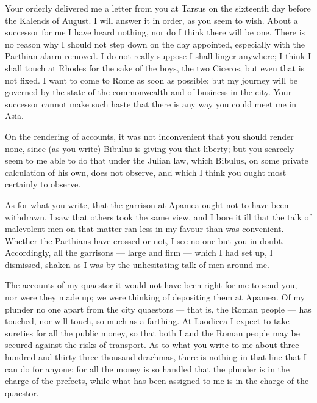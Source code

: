 

 Your orderly delivered me a letter from you at Tarsus on the sixteenth day before the Kalends of August. I will answer it in order, as you seem to wish. About a successor for me I have heard nothing, nor do I think there will be one. There is no reason why I should not step down on the day appointed, especially with the Parthian alarm removed. I do not really suppose I shall linger anywhere; I think I shall touch at Rhodes for the sake of the boys, the two Ciceros, but even that is not fixed. I want to come to Rome as soon as possible; but my journey will be governed by the state of the commonwealth and of business in the city. Your successor cannot make such haste that there is any way you could meet me in Asia.

 On the rendering of accounts, it was not inconvenient that you should render none, since (as you write) Bibulus is giving you that liberty; but you scarcely seem to me able to do that under the Julian law, which Bibulus, on some private calculation of his own, does not observe, and which I think you ought most certainly to observe.

 As for what you write, that the garrison at Apamea ought not to have been withdrawn, I saw that others took the same view, and I bore it ill that the talk of malevolent men on that matter ran less in my favour than was convenient. Whether the Parthians have crossed or not, I see no one but you in doubt. Accordingly, all the garrisons --- large and firm --- which I had set up, I dismissed, shaken as I was by the unhesitating talk of men around me.

 The accounts of my quaestor it would not have been right for me to send you, nor were they made up; we were thinking of depositing them at Apamea. Of my plunder no one apart from the city quaestors --- that is, the Roman people --- has touched, nor will touch, so much as a farthing. At Laodicea I expect to take sureties for all the public money, so that both I and the Roman people may be secured against the risks of transport. As to what you write to me about three hundred and thirty-three thousand drachmas, there is nothing in that line that I can do for anyone; for all the money is so handled that the plunder is in the charge of the prefects, while what has been assigned to me is in the charge of the quaestor.

